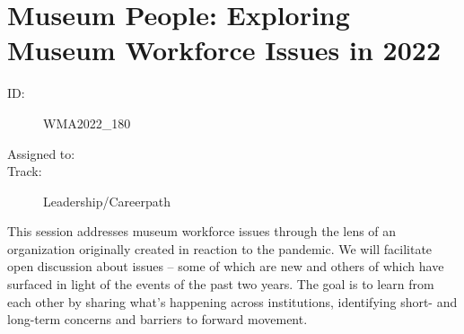 \documentclass{report}
\begin{document}
              
        
          \newpage
          \section{ Museum People: Exploring Museum Workforce Issues in 2022 }
            \begin{description}
              \item [ID:]
              WMA2022\_180

              \item [Assigned to:]
                \item [Track:]Leadership/Careerpath~
              \end{description}

              This session addresses museum workforce issues through the lens of an organization originally created in reaction to the pandemic. We will facilitate open discussion about issues – some of which are new and others of which have surfaced in light of the events of the past two years. The goal is to learn from each other by sharing what’s happening across institutions, identifying short- and long-term concerns and barriers to forward movement.
\end{document}
